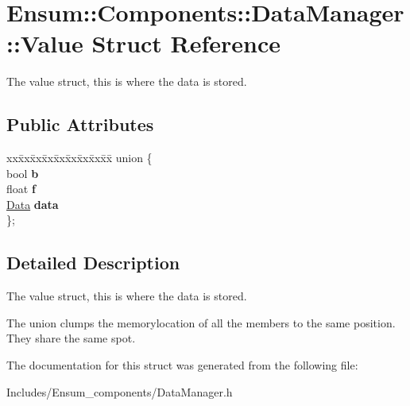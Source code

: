 \hypertarget{struct_ensum_1_1_components_1_1_data_manager_1_1_value}{}\section{Ensum\+:\+:Components\+:\+:Data\+Manager\+:\+:Value Struct Reference}
\label{struct_ensum_1_1_components_1_1_data_manager_1_1_value}


The value struct, this is where the data is stored.  


\subsection*{Public Attributes}
\begin{DoxyCompactItemize}
\item 
\begin{tabbing}
xx\=xx\=xx\=xx\=xx\=xx\=xx\=xx\=xx\=\kill
union \{\\
\>bool {\bfseries b}\\
\>float {\bfseries f}\\
\>\hyperlink{struct_ensum_1_1_components_1_1_data_manager_1_1_data}{Data} {\bfseries data}\\
\}; \hypertarget{struct_ensum_1_1_components_1_1_data_manager_1_1_value_a2574075dccef0806011258ddbe984e36}{}\label{struct_ensum_1_1_components_1_1_data_manager_1_1_value_a2574075dccef0806011258ddbe984e36}
\\

\end{tabbing}\end{DoxyCompactItemize}


\subsection{Detailed Description}
The value struct, this is where the data is stored. 

The union clumps the memorylocation of all the members to the same position. They share the same spot. 

The documentation for this struct was generated from the following file\+:\begin{DoxyCompactItemize}
\item 
Includes/\+Ensum\+\_\+components/Data\+Manager.\+h\end{DoxyCompactItemize}

